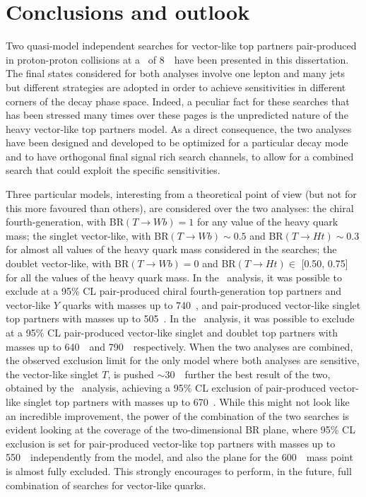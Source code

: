 \clearpage{\pagestyle{empty}\cleardoublepage}

\chapter*{Conclusions and outlook}\label{chap:conclusions}

Two quasi-model independent searches for vector-like top partners 
pair-produced in proton-proton collisions at a \cme\ of 8~\tev\ 
have been presented in this dissertation. The final states considered
for both analyses involve one lepton and many jets but different
strategies are adopted in order to achieve sensitivities in different
corners of the decay phase space. Indeed, a peculiar fact for these
searches that has been stressed many times over these pages is the 
unpredicted nature of the heavy vector-like top partners model. 
As a direct consequence, the two analyses have been designed
and developed to be optimized for a particular decay mode and
to have orthogonal final signal rich search channels, to allow
for a combined search that could exploit the specific sensitivities.

Three particular models, interesting from a theoretical point
of view (but not for this more favoured than others), are considered
over the two analyses: the chiral fourth-generation, with 
BR$(T\to Wb)=1$ for any value of the heavy quark mass; 
the singlet vector-like, with BR$(T\to Wb)\sim 0.5$ and 
BR$(T\to Ht)\sim 0.3$ for almost all
values of the heavy quark mass considered in the searches;
the doublet vector-like, with BR$(T\to Wb)= 0$ and 
BR$(T\to Ht)\in$ [0.50, 0.75] for all the values of the heavy quark mass.
In the \wbx\ analysis, it was possible to exclude at a 95\% CL
pair-produced chiral fourth-generation top partners and vector-like
$Y$ quarks with masses up to 740~\gev, and pair-produced vector-like 
singlet top partners with  masses up to 505~\gev.
In the \htx\ analysis, it was possible to exclude at a 95\% CL
pair-produced vector-like singlet and doublet top partners with 
masses up to 640~\gev\ and 790~\gev\ respectively.
When the two analyses are combined, the observed exclusion limit
for the only model where both analyses are sensitive, the
vector-like singlet $T$, is pushed $\sim$30~\gev\ further the
best result of the two, obtained by the \htx\ analysis,
achieving a 95\% CL exclusion of pair-produced vector-like singlet 
top partners with masses up to 670~\gev. While this might not
look like an incredible improvement, the power of the combination
of the two searches is evident looking at the coverage of the
two-dimensional BR plane, where  95\% CL exclusion is set for
pair-produced vector-like top partners with masses up to 550~\gev\ 
independently from the model, and also the plane for the 600~\gev\ mass
point is almost fully excluded. This strongly encourages to perform,
in the future, full combination of searches for vector-like quarks.

